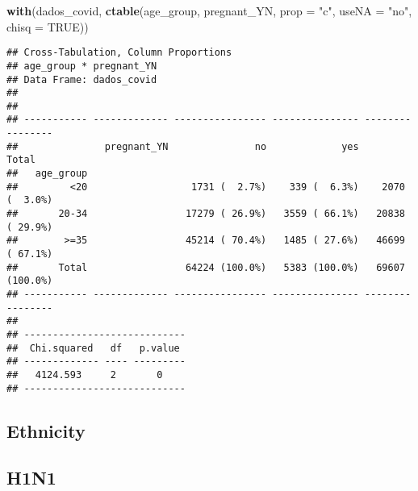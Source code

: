 \documentclass[
]{article}
\newenvironment{Shaded}{\begin{snugshade}}{\end{snugshade}}
\newcommand{\DataTypeTok}[1]{\textcolor[rgb]{0.13,0.29,0.53}{#1}}
\newcommand{\KeywordTok}[1]{\textcolor[rgb]{0.13,0.29,0.53}{\textbf{#1}}}
\newcommand{\NormalTok}[1]{#1}
\newcommand{\OtherTok}[1]{\textcolor[rgb]{0.56,0.35,0.01}{#1}}
\newcommand{\StringTok}[1]{\textcolor[rgb]{0.31,0.60,0.02}{#1}}
\begin{document}
\begin{Shaded}
\begin{Highlighting}[]
\KeywordTok{with}\NormalTok{(dados_covid, }\KeywordTok{ctable}\NormalTok{(age_group, pregnant_YN, }\DataTypeTok{prop =} \StringTok{"c"}\NormalTok{, }\DataTypeTok{useNA =} \StringTok{"no"}\NormalTok{, }\DataTypeTok{chisq =} \OtherTok{TRUE}\NormalTok{))}
\end{Highlighting}
\end{Shaded}

\begin{verbatim}
## Cross-Tabulation, Column Proportions  
## age_group * pregnant_YN  
## Data Frame: dados_covid  
## 
## 
## ----------- ------------- ---------------- --------------- ----------------
##               pregnant_YN               no             yes            Total
##   age_group                                                                
##         <20                  1731 (  2.7%)    339 (  6.3%)    2070 (  3.0%)
##       20-34                 17279 ( 26.9%)   3559 ( 66.1%)   20838 ( 29.9%)
##        >=35                 45214 ( 70.4%)   1485 ( 27.6%)   46699 ( 67.1%)
##       Total                 64224 (100.0%)   5383 (100.0%)   69607 (100.0%)
## ----------- ------------- ---------------- --------------- ----------------
## 
## ----------------------------
##  Chi.squared   df   p.value 
## ------------- ---- ---------
##   4124.593     2       0    
## ----------------------------
\end{verbatim}

\hypertarget{ethnicity}{%
\subsection{Ethnicity}\label{ethnicity}}

\hypertarget{h1n1-2}{%
\subsection{H1N1}\label{h1n1-2}}
\end{document}
